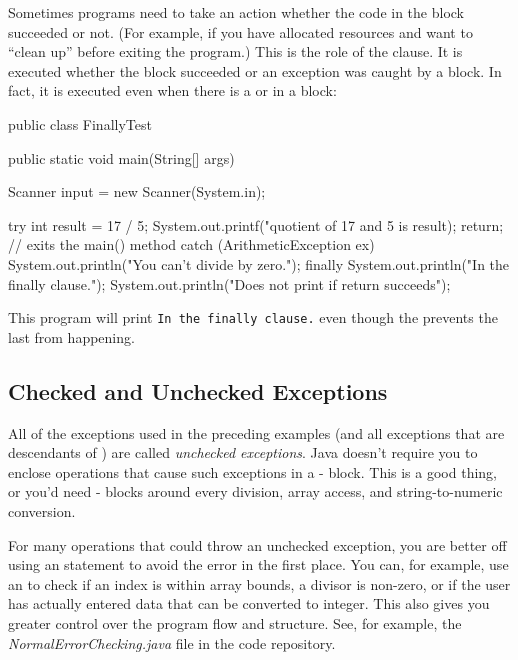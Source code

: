 Sometimes programs need to take an action whether the code in the  block succeeded or not. (For example, if you have allocated resources and want to ``clean up'' before exiting the program.) This is the role of the  clause. It is executed whether the  block succeeded or an exception was caught by a  block. In fact, it is executed even when there is a  or  in a block:

\begin{code}
public class FinallyTest {

    public static void main(String[] args) {
        Scanner input = new Scanner(System.in);
        
        try {
            int result = 17 / 5;
            System.out.printf("quotient of 17 and 5 is %
               result);
            return; // exits the main() method
        }
        catch (ArithmeticException ex) {
            System.out.println("You can't divide by zero.");
        }
        finally {
            System.out.println("In the finally clause.");
        }
        System.out.println("Does not print if return succeeds");
    }
}
\end{code}

This program will print \texttt{In the finally clause.} even though the  prevents the last  from happening.

\subsection{Checked and Unchecked Exceptions}

All of the exceptions used in the preceding examples (and all exceptions that are descendants of ) are called {\em unchecked exceptions}. Java doesn't require you to enclose operations that cause such exceptions in a - block. This is a good thing, or you'd need - blocks around every division, array access, and string-to-numeric conversion.

For many operations that could throw an unchecked exception, you are better off using an  statement to avoid the error in the first place. You can, for example, use an  to check if an index is within array bounds, a divisor is non-zero, or if the user has actually entered data that can be converted to integer. This also gives you greater control over the program flow and structure. See, for example, the {\it NormalErrorChecking.java} file in the code repository.

